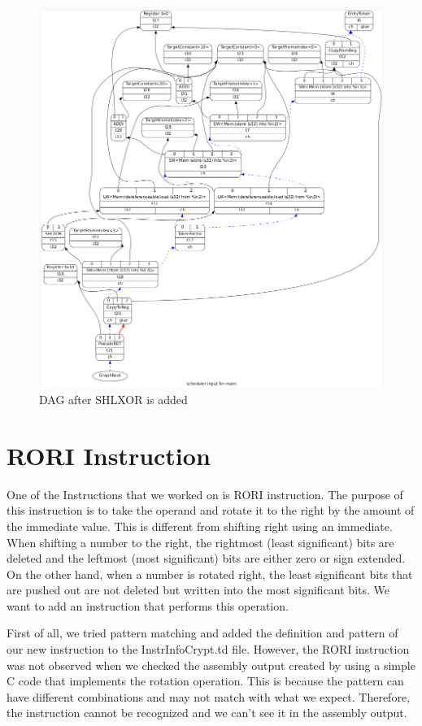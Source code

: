 \begin{figure}[h!]
    \centering
    \includegraphics[scale= 0.3]{adding_new_instr/shlxor_after.png}
    \caption{DAG after SHLXOR is added}
    \label{fig:shlxor_after}
\end{figure}

\section{RORI Instruction}\label{sec:rori}
One of the Instructions that we worked on is RORI instruction. The purpose of this instruction is to take the operand and rotate it to the right by the amount of the immediate value. This is different from shifting right using an immediate. When shifting a number to the right, the rightmost (least significant) bits are deleted and the leftmost (most significant) bits are either zero or sign extended. On the other hand, when a number is rotated right, the least significant bits that are pushed out are not deleted but written into the most significant bits. We want to add an instruction that performs this operation.

First of all, we tried pattern matching and added the definition and pattern of our new instruction to the InstrInfoCrypt.td file. However, the RORI instruction was not observed when we checked the assembly output created by using a simple C code that implements the rotation operation. This is because the pattern can have different combinations and may not match with what we expect. Therefore, the instruction cannot be recognized and we can’t see it in the assembly output.


